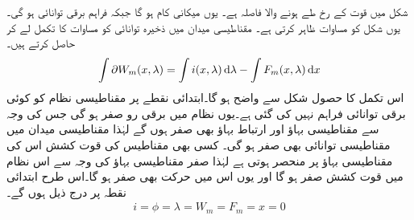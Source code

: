 شکل   میں قوت   کے رخ طے ہونے والا فاصلہ  ہے۔ یوں  میکانی کام  ہو گا جبکہ  فراہم برقی توانائی  ہو گی۔ یوں شکل    کو مساوات   ظاہر کرتی ہے۔ مقناطیسی میدان میں ذخیرہ توانائی  کو مساوات   کا تکمل  لے کر حاصل کرتے ہیں۔
\begin{align}\label{مساوات_تبادلہ_توانائی_تکمل}
\int \partial W_m(x,\lambda) = \int i(x,\lambda) \dif \lambda-\int F_m(x,\lambda) \dif x
\end{align}
اس تکمل کا حصول شکل    سے واضح ہو گا۔ابتدائی نقطے پر مقناطیسی نظام کو کوئی برقی توانائی فراہم نہیں کی گئی ہے۔یوں نظام میں  برقی رو صفر ہو گی جس کی وجہ سے   مقناطیسی بہاؤ اور  ارتباط بہاؤ بھی صفر ہوں گے  لہٰذا  مقناطیسی میدان میں مقناطیسی توانائی بھی صفر ہو گی۔ کسی بھی مقناطیس کی قوت کشش اس کی مقناطیسی بہاؤ پر منحصر ہوتی ہے لہٰذا صفر مقناطیسی بہاؤ کی وجہ سے  اس نظام میں قوت کشش صفر ہو گا اور یوں اس میں حرکت بھی صفر ہو گا۔اس طرح ابتدائی نقطہ پر درج ذیل ہوں گے۔
\begin{align*}
i=\phi=\lambda=W_m=F_m=x=0
\end{align*}

